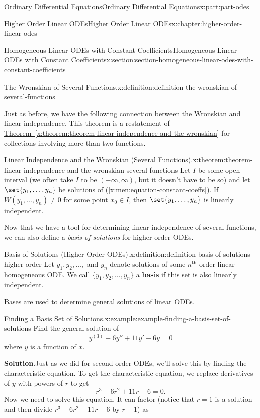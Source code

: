 \documentclass[oneside,10pt,]{book}
\newcommand{\blocktitlefont}{\relax}
\newcommand{\xreffont}{\relax}
\newcommand{\terminology}[1]{\textbf{#1}}
\numberwithin{equation}{part}
\begin{document}
\begin{partptx}{Ordinary Differential Equations}{}{Ordinary Differential Equations}{}{}{x:part:part-odes}
\begin{chapterptx}{Higher Order Linear ODEs}{}{Higher Order Linear ODEs}{}{}{x:chapter:higher-order-linear-odes}
\begin{sectionptx}{Homogeneous Linear ODEs with Constant Coefficients}{}{Homogeneous Linear ODEs with Constant Coefficients}{}{}{x:section:section-homogeneous-linear-odes-with-constant-coefficients}
\begin{definition}{The Wronskian of Several Functions.}{x:definition:definition-the-wronskian-of-several-functions}
\end{definition}
Just as before, we have the following connection between the Wronskian and linear independence. This theorem is a restatement of \hyperref[x:theorem:theorem-linear-independence-and-the-wronskian]{Theorem~{\xreffont\ref{x:theorem:theorem-linear-independence-and-the-wronskian}}} for collections involving more than two functions.%
\begin{theorem}{Linear Independence and the Wronskian (Several Functions).}{}{x:theorem:theorem-linear-independence-and-the-wronskian-several-functions}%
Let \(I\) be some open interval (we often take \(I\) to be \((-\infty,\infty)\), but it doesn't have to be so) and let \(\set{y_{1},\dots,y_{n}}\) be solutions of \hyperref[x:men:equation-constant-coeffs]{({\xreffont\ref{x:men:equation-constant-coeffs}})}. If \(W(y_{1},\dots,y_{n})\neq0\) for some point \(x_{0}\in I\), then \(\set{y_{1},\dots,y_{n}}\) is linearly independent.%
\end{theorem}
Now that we have a tool for determining linear independence of several functions, we can also define a \emph{basis of solutions} for higher order ODEs.%
\begin{definition}{Basis of Solutions (Higher Order ODEs).}{x:definition:definition-basis-of-solutions-higher-order}%
%
Let \(y_{1}, y_{2},\ldots,\) and \(y_{n}\) denote solutions of some \(n^{\text{th}}\) order linear homogeneous ODE. We call \(\{y_{1},y_{2},\ldots,y_{n}\}\) a \terminology{basis} if this set is also linearly independent.%
\end{definition}
Bases are used to determine general solutions of linear ODEs.%
\begin{example}{Finding a Basis Set of Solutions.}{x:example:example-finding-a-basis-set-of-solutions}%
Find the general solution of%
\begin{equation*}
y^{(3)}-6y''+11y'-6y=0
\end{equation*}
where \(y\) is a function of \(x\).%
\par\smallskip%
\noindent\textbf{\blocktitlefont Solution}.\hypertarget{g:solution:idp105548779584928}{}\quad{}Just as we did for second order ODEs, we'll solve this by finding the characteristic equation. To get the characteristic equation, we replace derivatives of \(y\) with powers of \(r\) to get%
\begin{equation*}
r^{3}-6r^{2}+11r-6=0.
\end{equation*}
Now we need to solve this equation. It can factor (notice that \(r=1\) is a solution and then divide \(r^{3}-6r^{2}+11r-6\) by \(r-1\)) as%

\end{example}
\end{sectionptx}
\end{chapterptx}
\end{partptx}
\end{document}
